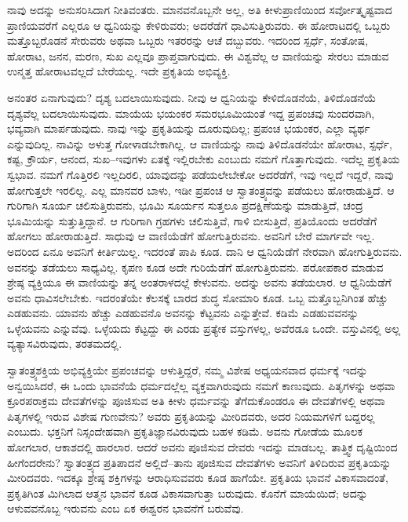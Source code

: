 ನಾವು ಅದನ್ನು ಅನುಸರಿಸಿದಾಗ ನೀತಿವಂತರು. ಮಾನವನೊಬ್ಬನೇ ಅಲ್ಲ, ಅತಿ ಕೀಳುಪ್ರಾಣಿಯಿಂದ ಸರ್ವೋತ್ಕೃಷ್ಟವಾದ ಪ್ರಾಣಿಯವರೆಗೆ ಎಲ್ಲರೂ ಆ ಧ್ವನಿಯನ್ನು ಕೇಳಿರುವರು; ಅದರೆಡೆಗೆ ಧಾವಿಸುತ್ತಿರುವರು. ಈ ಹೋರಾಟದಲ್ಲಿ ಒಬ್ಬರು ಮತ್ತೊಬ್ಬರೊಡನೆ ಸೇರುವರು ಅಥವಾ ಒಬ್ಬರು ಇತರರನ್ನು ಆಚೆ ದಬ್ಬುವರು. ಇದರಿಂದ ಸ್ಪರ್ಧೆ, ಸಂತೋಷ, ಹೋರಾಟ, ಜನನ, ಮರಣ, ಸುಖ ಎಲ್ಲವೂ ಪ್ರಾಪ್ತವಾಗುವುದು. ಈ ವಿಶ್ವವೆಲ್ಲ ಆ ವಾಣಿಯನ್ನು ಸೇರಲು ಮಾಡುವ ಉನ್ಮತ್ತ ಹೋರಾಟವಲ್ಲದೆ ಬೇರೆಯಲ್ಲ. ಇದೇ ಪ್ರಕೃತಿಯ ಅಭಿವ್ಯಕ್ತಿ.

\vskip 0.2cm

ಅನಂತರ ಏನಾಗುವುದು? ದೃಶ್ಯ ಬದಲಾಯಿಸುವುದು. ನೀವು ಆ ಧ್ವನಿಯನ್ನು ಕೇಳಿದೊಡನೆಯೆ, ತಿಳಿದೊಡನೆಯೆ ದೃಶ್ಯವೆಲ್ಲ ಬದಲಾಯಿಸುವುದು. ಮಾಯೆಯ ಭಯಂಕರ ಸಮರಭೂಮಿಯಂತೆ ಇದ್ದ ಪ್ರಪಂಚವು ಸುಂದರವಾಗಿ, ಭವ್ಯವಾಗಿ ಮಾರ್ಪಡುವುದು. ನಾವು ಇನ್ನು ಪ್ರಕೃತಿಯನ್ನು ದೂರುವುದಿಲ್ಲ; ಪ್ರಪಂಚ ಭಯಂಕರ, ಎಲ್ಲಾ ವ್ಯರ್ಥ ಎನ್ನುವುದಿಲ್ಲ. ನಾವಿನ್ನು ಅಳುತ್ತ ಗೋಳಾಡಬೇಕಾಗಿಲ್ಲ. ಆ ವಾಣಿಯನ್ನು ನಾವು ತಿಳಿದೊಡನೆಯೇ ಹೋರಾಟ, ಸ್ಪರ್ಧೆ, ಕಷ್ಟ, ಕ್ರೌರ್ಯ, ಆನಂದ, ಸುಖ–ಇವುಗಳು ಏತಕ್ಕೆ ಇಲ್ಲಿರಬೇಕು ಎಂಬುದು ನಮಗೆ ಗೊತ್ತಾಗುವುದು. ಇದೆಲ್ಲ ಪ್ರಕೃತಿಯ ಸ್ವಭಾವ. ನಮಗೆ ಗೊತ್ತಿರಲಿ ಇಲ್ಲದಿರಲಿ, ಯಾವುದನ್ನು ಪಡೆಯಲೇಬೇಕೋ ಅದರೆಡೆಗೆ, ಇವು ಇಲ್ಲದೆ ಇದ್ದರೆ, ನಾವು ಹೋಗುತ್ತಲೇ ಇರಲಿಲ್ಲ. ಎಲ್ಲ ಮಾನವರ ಬಾಳು, ಇಡೀ ಪ್ರಪಂಚ ಆ ಸ್ವಾತಂತ್ರ್ಯವನ್ನು ಪಡೆಯಲು ಹೋರಾಡುತ್ತಿದೆ. ಆ ಗುರಿಗಾಗಿ ಸೂರ್ಯ ಚಲಿಸುತ್ತಿರುವನು, ಭೂಮಿ ಸೂರ್ಯನ ಸುತ್ತಲೂ ಪ್ರದಕ್ಷಿಣೆಯನ್ನು ಮಾಡುತ್ತಿದೆ, ಚಂದ್ರ ಭೂಮಿಯನ್ನು ಸುತ್ತುತ್ತಿದ್ದಾನೆ. ಆ ಗುರಿಗಾಗಿ ಗ್ರಹಗಳು ಚಲಿಸುತ್ತಿವೆ, ಗಾಳಿ ಬೀಸುತ್ತಿದೆ, ಪ್ರತಿಯೊಂದು ಅದರೆಡೆಗೆ ಹೋಗಲು ಹೋರಾಡುತ್ತಿದೆ. ಸಾಧುವು ಆ ವಾಣಿಯೆಡೆಗೆ ಹೋಗುತ್ತಿರುವನು. ಅವನಿಗೆ ಬೇರೆ ಮಾರ್ಗವೇ ಇಲ್ಲ. ಅದರಿಂದ ಏನೂ ಅವನಿಗೆ ಕೀರ್ತಿಯಿಲ್ಲ. ಇದರಂತೆ ಪಾಪಿ ಕೂಡ. ದಾನಿ ಆ ಧ್ವನಿಯೆಡೆಗೆ ನೇರವಾಗಿ ಹೋಗುತ್ತಿರುವನು. ಅವನನ್ನು ತಡೆಯಲು ಸಾಧ್ಯವಿಲ್ಲ. ಕೃಪಣ ಕೂಡ ಅದೇ ಗುರಿಯೆಡೆಗೆ ಹೋಗುತ್ತಿರುವನು. ಪರೋಪಕಾರ ಮಾಡುವ ಶ್ರೇಷ್ಠ ವ್ಯಕ್ತಿಯೂ ಈ ವಾಣಿಯನ್ನು ತನ್ನ ಅಂತರಾಳದಲ್ಲೆ ಕೇಳುವನು. ಅದನ್ನು ಅವನು ತಡೆಯಲಾರ. ಆ ಧ್ವನಿಯೆಡೆಗೆ ಅವನು ಧಾವಿಸಲೇಬೇಕು. ಇದರಂತೆಯೇ ಕೆಲಸಕ್ಕೆ ಬಾರದ ಶುದ್ಧ ಸೋಮಾರಿ ಕೂಡ. ಒಬ್ಬ ಮತ್ತೊಬ್ಬನಿಗಿಂತ ಹೆಚ್ಚು ಎಡಹುವನು. ಯಾವನು ಹೆಚ್ಚು ಎಡಹುವನೊ ಅವನನ್ನು ಕೆಟ್ಟವನು ಎನ್ನುತ್ತೇವೆ. ಕಡಿಮೆ ಎಡಹುವವನನ್ನು ಒಳ್ಳೆಯವನು ಎನ್ನುವೆವು. ಒಳ್ಳೆಯದು ಕೆಟ್ಟದ್ದು ಈ ಎರಡು ಪ್ರತ್ಯೇಕ ವಸ್ತುಗಳಲ್ಲ, ಅವೆರಡೂ ಒಂದೇ. ವಸ್ತುವಿನಲ್ಲಿ ಅಲ್ಲ ವ್ಯತ್ಯಾಸವಿರುವುದು, ತರತಮದಲ್ಲಿ.

\vskip 0.2cm

ಸ್ವಾತಂತ್ರ್ಯಶಕ್ತಿಯ ಅಭಿವ್ಯಕ್ತಿಯೇ ಪ್ರಪಂಚವನ್ನು ಆಳುತ್ತಿದ್ದರೆ, ನಮ್ಮ ವಿಶೇಷ ಅಧ್ಯಯನವಾದ ಧರ್ಮಕ್ಕೆ ಇದನ್ನು ಅನ್ವಯಿಸಿದರೆ, ಈ ಒಂದು ಭಾವನೆಯೆ ಧರ್ಮದಲ್ಲೆಲ್ಲ ವ್ಯಕ್ತವಾಗಿರುವುದು ನಮಗೆ ಕಾಣುವುದು. ಪಿತೃಗಳನ್ನು ಅಥವಾ ಕ್ರೂರಪರಾಕ್ರಮ ದೇವತೆಗಳನ್ನು ಪೂಜಿಸುವ ಅತಿ ಕೀಳು ಧರ್ಮವನ್ನು ತೆಗೆದುಕೊಂಡರೂ ಈ ದೇವತೆಗಳಲ್ಲಿ ಅಥವಾ ಪಿತೃಗಳಲ್ಲಿ ಇರುವ ವಿಶೇಷ ಗುಣವೇನು? ಅವರು ಪ್ರಕೃತಿಯನ್ನು ಮೀರಿದವರು, ಅದರ ನಿಯಮಗಳಿಗೆ ಬದ್ದರಲ್ಲ ಎಂಬುದು. ಭಕ್ತನಿಗೆ ನಿಸ್ಸಂದೇಹವಾಗಿ ಪ್ರಕೃತಿಜ್ಞಾನವಿರುವುದು ಬಹಳ ಕಡಿಮೆ. ಅವನು ಗೋಡೆಯ ಮೂಲಕ ಹೋಗಲಾರ, ಆಕಾಶದಲ್ಲಿ ಹಾರಲಾರ. ಆದರೆ ಅವನು ಪೂಜಿಸುವ ದೇವರು ಇದನ್ನು ಮಾಡಬಲ್ಲ. ತಾತ್ತ್ವಿಕ ದೃಷ್ಟಿಯಿಂದ ಹೀಗೆಂದರೇನು? ಸ್ವಾತಂತ್ರ್ಯದ ಪ್ರತಿಪಾದನೆ ಅಲ್ಲಿದೆ–ತಾನು ಪೂಜಿಸುವ ದೇವತೆಗಳು ಅವನಿಗೆ ತಿಳಿದಿರುವ ಪ್ರಕೃತಿಯನ್ನು ಮೀರಿದವರು. ಇದಕ್ಕೂ ಶ್ರೇಷ್ಠ ಶಕ್ತಿಗಳನ್ನು ಆರಾಧಿಸುವವರು ಕೂಡ ಹಾಗೆಯೇ. ಪ್ರಕೃತಿಯ ಭಾವನೆ ವಿಕಾಸವಾದಂತೆ, ಪ್ರಕೃತಿಗಿಂತ ಮಿಗಿಲಾದ ಆತ್ಮನ ಭಾವನೆ ಕೂಡ ವಿಕಾಸವಾಗುತ್ತಾ ಬರುವುದು. ಕೊನೆಗೆ ಮಾಯೆಯಿದೆ; ಅದನ್ನು ಆಳುವವನೊಬ್ಬ ಇರುವನು ಎಂಬ ಏಕ ಈಶ್ವರನ ಭಾವನೆಗೆ ಬರುವೆವು.


